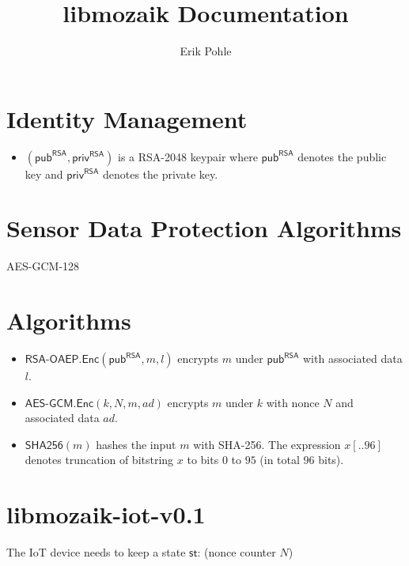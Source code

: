\documentclass[10pt,a4paper]{article}
\title{libmozaik Documentation}
\author{Erik Pohle}
\newcommand{\pub}{\ensuremath{\mathsf{pub}}}
\newcommand{\priv}{\ensuremath{\mathsf{priv}}}
\newcommand{\pubRSA}{\ensuremath{\pub^{\mathsf{RSA}}}}
\newcommand{\privRSA}{\ensuremath{\priv^{\mathsf{RSA}}}}
\newcommand{\pubEd}{\ensuremath{\pub^{\mathsf{Ed}}}}
\newcommand{\privEd}{\ensuremath{\priv^{\mathsf{Ed}}}}
\newcommand{\RSAOAEP}{\ensuremath{\textsf{RSA-OAEP}}}
\newcommand{\AESGCM}{\ensuremath{\textsf{AES-GCM}}}
\newcommand{\Encrypt}{\ensuremath{\textsf{Enc}}}
\newcommand{\hash}{\ensuremath{\textsf{SHA256}}}
\begin{document}
	\maketitle

\section{Identity Management}
\begin{itemize}
	\item $(\pubRSA,\privRSA)$ is a RSA-2048 keypair where $\pubRSA$ denotes the public key and $\privRSA$ denotes the private key.
\end{itemize}

\section{Sensor Data Protection Algorithms}
\begin{description}
	\item[AES-GCM-128]
\end{description}

\section{Algorithms}
\begin{itemize}
	\item $\RSAOAEP.\Encrypt(\pubRSA, m, l)$ encrypts $m$ under $\pubRSA$ with associated data $l$.
	\item $\AESGCM.\Encrypt(k,N,m,ad)$ encrypts $m$ under $k$ with nonce $N$ and associated data $ad$.
	\item $\hash(m)$ hashes the input $m$ with SHA-256. The expression $x[..96]$ denotes truncation of bitstring $x$ to bits $0$ to $95$ (in total 96 bits).
\end{itemize}

\section{libmozaik-iot-v0.1}
The IoT device needs to keep a state $\mathsf{st}$: (nonce counter $N$)
\end{document}
